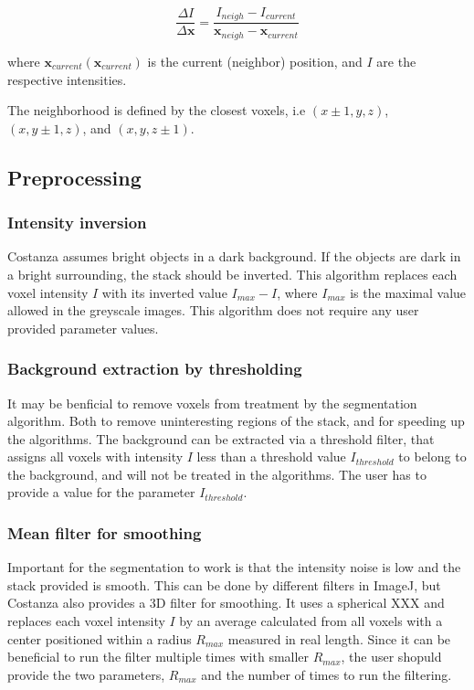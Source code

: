 \documentclass[a4paper,12pt]{article}
\begin{document}
\begin{equation}
\frac{\Delta I}{\Delta \mathbf{x}} =
\frac{I_{neigh}-I_{current}}{\mathbf{x}_{neigh}-\mathbf{x}_{current}}
\end{equation}

where $\mathbf{x}_{current}(\mathbf{x}_{current})$ is the current (neighbor)
position, and $I$ are the respective intensities.

The neighborhood is defined by the closest voxels, i.e
$(x\pm1,y,z)$, $(x,y\pm1,z)$, and $(x,y,z\pm1)$.


\subsection{Preprocessing}

\subsubsection{Intensity inversion}

Costanza assumes bright objects in a dark background. If the objects
are dark in a bright surrounding, the stack should be inverted. This
algorithm replaces each voxel intensity $I$ with its inverted value
$I_{max}-I$, where $I_{max}$ is the maximal value allowed in the
greyscale images. This algorithm does not require any user provided
parameter values.

\subsubsection{Background extraction by thresholding}

It may be benficial to remove voxels from treatment by the
segmentation algorithm. Both to remove uninteresting regions of the
stack, and for speeding up the algorithms. The background can be
extracted via a threshold filter, that assigns all voxels with
intensity $I$ less than a threshold value $I_{threshold}$ to belong to
the background, and will not be treated in the algorithms. The user
has to provide a value for the parameter $I_{threshold}$.

\subsubsection{Mean filter for smoothing}

Important for the segmentation to work is that the intensity noise is
low and the stack provided is smooth. This can be done by different
filters in ImageJ, but Costanza also provides a 3D filter for
smoothing. It uses a spherical XXX and replaces each voxel intensity
$I$ by an average calculated from all voxels with a center positioned
within a radius $R_{max}$ measured in real length. Since it can be
beneficial to run the filter multiple times with smaller $R_{max}$,
the user shopuld provide the two parameters, $R_{max}$ and the number
of times to run the filtering.
\end{document}

